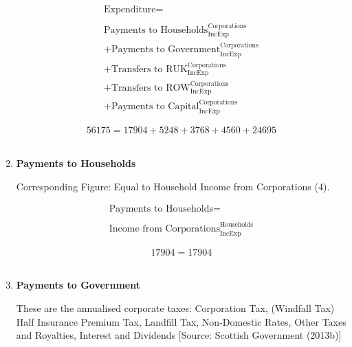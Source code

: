\begin{enumerate}
\begin{equation}
\begin{split}
\text{Expenditure} =  \\ \\
\text{Payments to Households}^\text{Corporations}_\text{IncExp}\\
+\text{Payments to Government}^\text{Corporations}_\text{IncExp}\\
+\text{Transfers to RUK}^\text{Corporations}_\text{IncExp}\\
+\text{Transfers to ROW}^\text{Corporations}_\text{IncExp}\\
+\text{Payments to Capital}^\text{Corporations}_\text{IncExp}
\end{split} \label{eq:2.5.28}
\end{equation}

\begin{equation} \nonumber
56175 = 17904+5248+3768+4560+24695
\end{equation}\\


\item \textbf {Payments to Households}

Corresponding Figure: Equal to Household Income from Corporations (4).

\begin{equation}
\begin{split}
\text{Payments to Households} =  \\ \\
\text{Income from Corporations}^\text{Households}_\text{IncExp}
\end{split} \label{eq:2.5.29}
\end{equation}

\begin{equation} \nonumber
17904 = 17904
\end{equation}\\


\item \textbf {Payments to Government}

These are the annualised corporate taxes: Corporation Tax, (Windfall Tax) Half Insurance Premium Tax, Landfill Tax, Non-Domestic Rates, Other Taxes and Royalties, Interest and Dividends [Source: Scottish Government (2013b)]


\end{enumerate}
